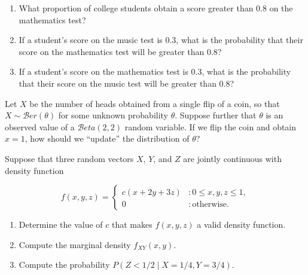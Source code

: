 \documentclass[12pt,reqno]{amsart}
\begin{document}
\medskip
\begin{enumerate}
\item What proportion of college students obtain a score greater than 0.8 on the mathematics test?\vfill

\item If a student’s score on the music test is 0.3, what is the probability that their score on the mathematics test will be greater than 0.8?\vfill



\item If a student’s score on the mathematics test is 0.3, what is the probability that their score on the music test will be greater than 0.8?\vfill




\end{enumerate}














\bigskip
\prob Let $X$ be the number of heads obtained from a single flip of a coin, so that $X\sim \mathcal{B}er(\theta)$ for some unknown probability $\theta$. Suppose further that $\theta$ is an observed value of a $\mathcal{B}eta(2,2)$ random variable. If we flip the coin and obtain $x=1$, how should we ``update'' the distribution of $\theta$?\vfill













\newpage
\prob Suppose that three random vectors $X$, $Y$, and $Z$ are jointly continuous with density function

	\[f(x,y,z) = \begin{cases}
	c(x+2y+3z) & : 0\leq x, y, z \leq 1, \\
	0 & : \text{otherwise}.
	\end{cases}
	\]

\medskip
\begin{enumerate}
\item Determine the value of $c$ that makes $f(x,y,z)$ a valid density function.\vfill



\item Compute the marginal density $f_{XY}(x,y)$.\vfill



\item Compute the probability $P\left( Z < 1/2 \mid X = 1/4,  Y = 3/4 \right)$.\vfill


\end{enumerate}
\end{document}
